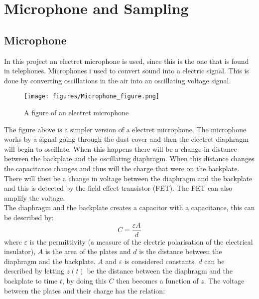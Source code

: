 \chapter{Microphone and Sampling}


\section{Microphone}
In this project an electret microphone is used, since this is the one that is found in telephones. 
Microphones i used to convert sound into a electric signal. This is done by converting oscillations in the air into an oscillating voltage signal. 

\begin{figure}[H]
    \centering
    \texttt{[image: figures/Microphone\_figure.png]}
    \caption{A figure of an electret microphone \cite[p. 160]{LectureNotes}}
    \label{fig:mic_figure}
\end{figure}

The figure above is a simpler version of a electret microphone. The microphone works by a signal going through the dust cover and then the electret diaphragm will begin to oscillate. When this happens there will be a change in distance between the backplate and the oscillating diaphragm. When this distance changes the capacitance changes and thus will the charge that were on the backplate. There will then be a change in voltage between the diaphragm and the backplate and this is detected by the field effect transistor (FET). The FET can also amplify the voltage. \\

The diaphragm and the backplate creates a capacitor with a capacitance, this can be described by:
$$ C = \dfrac{\varepsilon A}{d}$$ 
where $\varepsilon$ is the permittivity (a measure of the electric polarisation of the electrical insulator), $A$ is the area of the plates and $d$ is the distance between the diaphragm and the backplate. $A$ and $\varepsilon$ is considered constants. $d$ can be described by letting $z(t)$ be the distance between the diaphragm and the backplate to time $t$, by doing this $C$ then becomes a function of $z$. The voltage between the plates and their charge has the relation:
$$
\cite[p. 160]{LectureNotes}

